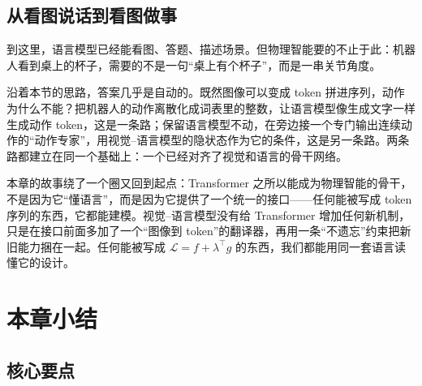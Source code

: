 \subsection{从看图说话到看图做事}

到这里，语言模型已经能看图、答题、描述场景。但物理智能要的不止于此：机器人看到桌上的杯子，需要的不是一句“桌上有个杯子”，而是一串关节角度。

沿着本节的思路，答案几乎是自动的。既然图像可以变成 token 拼进序列，动作为什么不能？把机器人的动作离散化成词表里的整数，让语言模型像生成文字一样生成动作 token，这是一条路；保留语言模型不动，在旁边接一个专门输出连续动作的“动作专家”，用视觉--语言模型的隐状态作为它的条件，这是另一条路。两条路都建立在同一个基础上：一个已经对齐了视觉和语言的骨干网络。

\begin{insightbox}[title=统一接口，再看一次]
本章的故事绕了一个圈又回到起点：Transformer 之所以能成为物理智能的骨干，不是因为它“懂语言”，而是因为它提供了一个统一的接口——任何能被写成 token 序列的东西，它都能建模。视觉--语言模型没有给 Transformer 增加任何新机制，只是在接口前面多加了一个“图像到 token”的翻译器，再用一条“不遗忘”约束把新旧能力捆在一起。任何能被写成 $\mathcal{L} = f + \lambda^\top g$ 的东西，我们都能用同一套语言读懂它的设计。
\end{insightbox}

\section{本章小结}

\subsection{核心要点}

